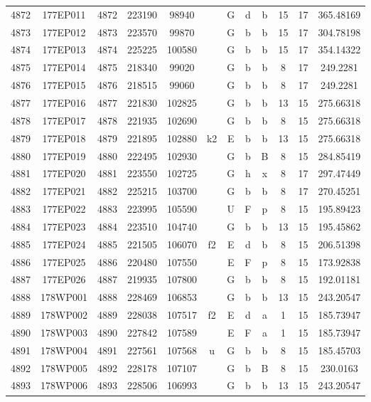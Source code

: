 \begin{tabular}{|*{12}{c|}}
4872 & 177EP011 & 4872 & 223190 & 98940 &  & G & d & b & 15 & 17 & 365.48169 \\ 
4873 & 177EP012 & 4873 & 223570 & 99870 &  & G & b & b & 15 & 17 & 304.78198 \\ 
4874 & 177EP013 & 4874 & 225225 & 100580 &  & G & b & b & 15 & 17 & 354.14322 \\ 
4875 & 177EP014 & 4875 & 218340 & 99020 &  & G & b & b & 8 & 17 & 249.2281 \\ 
4876 & 177EP015 & 4876 & 218515 & 99060 &  & G & b & b & 8 & 17 & 249.2281 \\ 
4877 & 177EP016 & 4877 & 221830 & 102825 &  & G & b & b & 13 & 15 & 275.66318 \\ 
4878 & 177EP017 & 4878 & 221935 & 102690 &  & G & b & b & 8 & 15 & 275.66318 \\ 
4879 & 177EP018 & 4879 & 221895 & 102880 & k2 & E & b & b & 13 & 15 & 275.66318 \\ 
4880 & 177EP019 & 4880 & 222495 & 102930 &  & G & b & B & 8 & 15 & 284.85419 \\ 
4881 & 177EP020 & 4881 & 223550 & 102725 &  & G & h & x & 8 & 17 & 297.47449 \\ 
4882 & 177EP021 & 4882 & 225215 & 103700 &  & G & b & b & 8 & 17 & 270.45251 \\ 
4883 & 177EP022 & 4883 & 223995 & 105590 &  & U & F & p & 8 & 15 & 195.89423 \\ 
4884 & 177EP023 & 4884 & 223510 & 104740 &  & G & b & b & 13 & 15 & 195.45862 \\ 
4885 & 177EP024 & 4885 & 221505 & 106070 & f2 & E & d & b & 8 & 15 & 206.51398 \\ 
4886 & 177EP025 & 4886 & 220480 & 107550 &  & E & F & p & 8 & 15 & 173.92838 \\ 
4887 & 177EP026 & 4887 & 219935 & 107800 &  & G & b & b & 8 & 15 & 192.01181 \\ 
4888 & 178WP001 & 4888 & 228469 & 106853 &  & G & b & b & 13 & 15 & 243.20547 \\ 
4889 & 178WP002 & 4889 & 228038 & 107517 & f2 & E & d & a & 1 & 15 & 185.73947 \\ 
4890 & 178WP003 & 4890 & 227842 & 107589 &  & E & F & a & 1 & 15 & 185.73947 \\ 
4891 & 178WP004 & 4891 & 227561 & 107568 & u & G & b & b & 8 & 15 & 185.45703 \\ 
4892 & 178WP005 & 4892 & 228178 & 107107 &  & G & b & B & 8 & 15 & 230.0163 \\ 
4893 & 178WP006 & 4893 & 228506 & 106993 &  & G & b & b & 13 & 15 & 243.20547 \\ 

\end{tabular}
